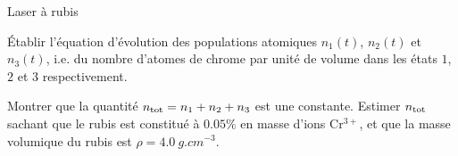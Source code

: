 \begin{exo}[PC][2][TD]{Laser à rubis}

\begin{quest}
\item Établir l'équation d'évolution des populations atomiques $n_1(t)$, $n_2(t)$ et $n_3(t)$, i.e. du nombre d'atomes de chrome par unité de volume dans les états $1$, $2$ et $3$ respectivement.
\item Montrer que la quantité $n_{\rm tot} = n_1+n_2+n_3$ est une constante. Estimer $n_{\rm tot}$ sachant que le rubis est constitué à $\num{0.05}\%$ en masse d’ions Cr$^{3+}$, et que la masse volumique du rubis est $\rho = \SI{4.0}{g.cm^{-3}}$.
\end{quest}
\end{exo}
